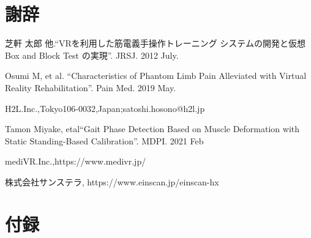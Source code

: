 \documentclass{ltjsreport}
\begin{document}
\chapter*{謝辞}

\begin{thebibliography}{99}

	芝軒 太郎 他.``VRを利用した筋電義手操作トレーニング
	システムの開発と仮想 Box and Block Test の実現''.
	JRSJ. 2012 July.

	Osumi M, et al.
	``Characteristics of Phantom Limb Pain Alleviated
	with Virtual Reality Rehabilitation''.
	Pain Med. 2019 May.

	H2L.Inc.,Tokyo106-0032,Japan;satoshi.hosono@h2l.jp

	Tamon Miyake, etal``Gait Phase Detection Based on Muscle Deformation
	with Static Standing-Based Calibration''.
	MDPI. 2021 Feb

	mediVR.Inc.,https://www.medivr.jp/

	株式会社サンステラ, https://www.einscan.jp/einscan-hx



\end{thebibliography}
\chapter*{付録}
\setcounter{page}{1}
\end{document}

